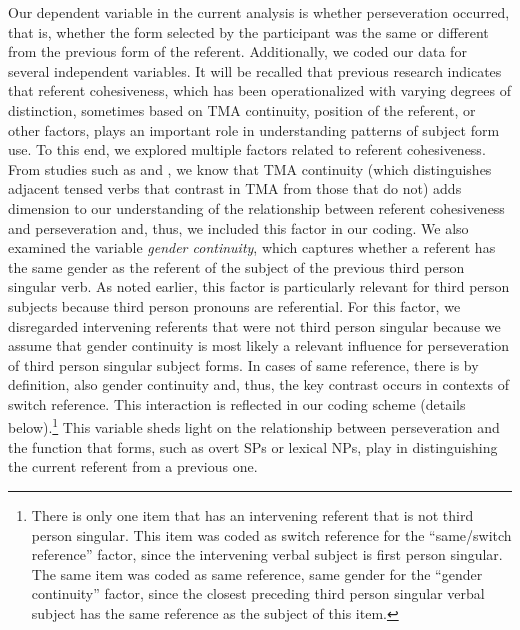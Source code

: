 \documentclass[output=paper]{langscibook}
\begin{document}
Our dependent variable in the current analysis is whether perseveration occurred, that is, whether the form selected by the participant was the same or different from the previous form of the referent. Additionally, we coded our data for several independent variables. It will be recalled that previous research indicates that referent cohesiveness, which has been operationalized with varying degrees of distinction, sometimes based on TMA continuity, position of the referent, or other factors, plays an important role in understanding patterns of subject form use. To this end, we explored multiple factors related to referent cohesiveness. From studies such as \citet{GeeslinGudmestad2011} and \citet{LinfordGeeslinForthcoming}, we know that TMA continuity (which distinguishes adjacent tensed verbs that contrast in TMA from those that do not) adds dimension to our understanding of the relationship between referent cohesiveness and perseveration and, thus, we included this factor in our coding. We also examined the variable \textit{gender continuity}, which captures whether a referent has the same gender as the referent of the subject of the previous third person singular verb. As noted earlier, this factor is particularly relevant for third person subjects because third person pronouns are referential. For this factor, we disregarded intervening referents that were not third person singular because we assume that gender continuity is most likely a relevant influence for perseveration of third person singular subject forms. In cases of same reference, there is by definition, also gender continuity and, thus, the key contrast occurs in contexts of switch reference. This interaction is reflected in our coding scheme (details below).\footnote{There is only one item that has an intervening referent that is not third person singular. This item was coded as switch reference for the “same/switch reference” factor, since the intervening verbal subject is first person singular. The same item was coded as same reference, same gender for the “gender continuity” factor, since the closest preceding third person singular verbal subject has the same reference as the subject of this item.} This variable sheds light on the relationship between perseveration and the function that forms, such as overt SPs or lexical NPs, play in distinguishing the current referent from a previous one.
\end{document}
